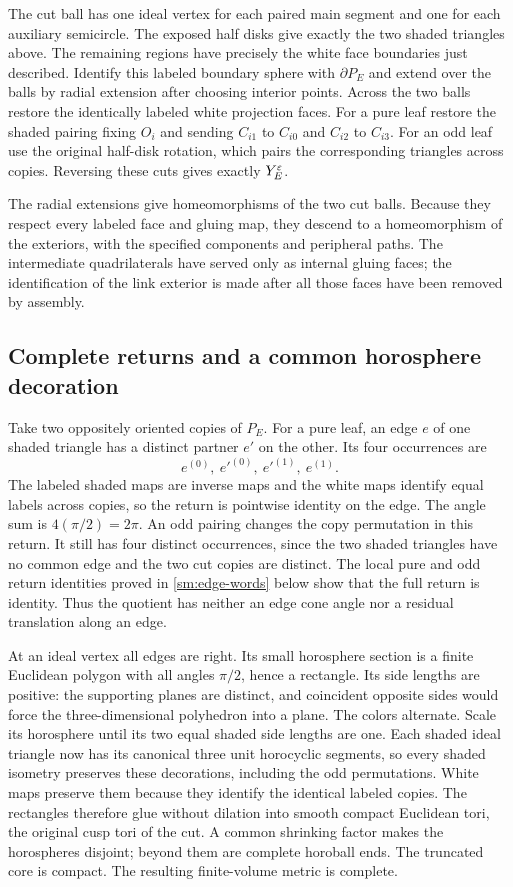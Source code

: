 The cut ball has one ideal vertex for each paired main segment
and one for each auxiliary semicircle. The exposed half disks give
exactly the two shaded triangles above. The remaining regions
have precisely the white face boundaries just described. Identify this
labeled boundary sphere with $\partial P_E$ and extend over the
balls by radial extension after choosing interior points.
Across the two balls restore the identically labeled white
projection faces. For a pure leaf restore the shaded pairing
fixing $O_i$ and sending $C_{i1}$ to $C_{i0}$ and $C_{i2}$ to
$C_{i3}$. For an odd leaf use the original half-disk rotation,
which pairs the corresponding triangles across copies.
Reversing these cuts gives exactly $Y_E^\varepsilon$.

The radial extensions give homeomorphisms of the two cut balls.
Because they respect every labeled face and gluing map, they descend
to a homeomorphism of the exteriors, with the specified components and
peripheral paths. The intermediate quadrilaterals have served only as
internal gluing faces; the identification of the link exterior is made
after all those faces have been removed by assembly.

\subsection{Complete returns and a common horosphere decoration}
Take two oppositely oriented copies of $P_E$. For a pure leaf, an
edge $e$ of one shaded triangle has a distinct partner $e'$ on
the other. Its four occurrences are
\[
                e^{(0)},\ e'^{(0)},\ e'^{(1)},\ e^{(1)}.
\]
The labeled shaded maps are inverse maps and the white maps identify
equal labels across copies, so the return is pointwise identity
on the edge. The angle sum is $4(\pi/2)=2\pi$.
An odd pairing changes the copy permutation in this return.
It still has four distinct occurrences, since the two shaded
triangles have no common edge and the two cut copies are distinct.
The local pure and odd return identities proved in
\eqref{sm:edge-words} below show that the full return is identity.
Thus the quotient has neither an edge cone angle nor a residual
translation along an edge.

At an ideal vertex all edges are right. Its small horosphere
section is a finite Euclidean polygon with all angles $\pi/2$,
hence a rectangle. Its side lengths are positive: the supporting
planes are distinct, and coincident opposite sides would force
the three-dimensional polyhedron into a plane. The colors alternate.
Scale its horosphere until its two equal shaded side lengths are one.
Each shaded ideal triangle now has its canonical three unit
horocyclic segments, so every shaded isometry preserves these
decorations, including the odd permutations. White maps preserve
them because they identify the identical labeled copies.
The rectangles therefore glue without dilation into smooth compact
Euclidean tori, the original cusp tori of the cut.
A common shrinking factor makes the horospheres disjoint; beyond
them are complete horoball ends. The truncated core is compact.
The resulting finite-volume metric is complete.

